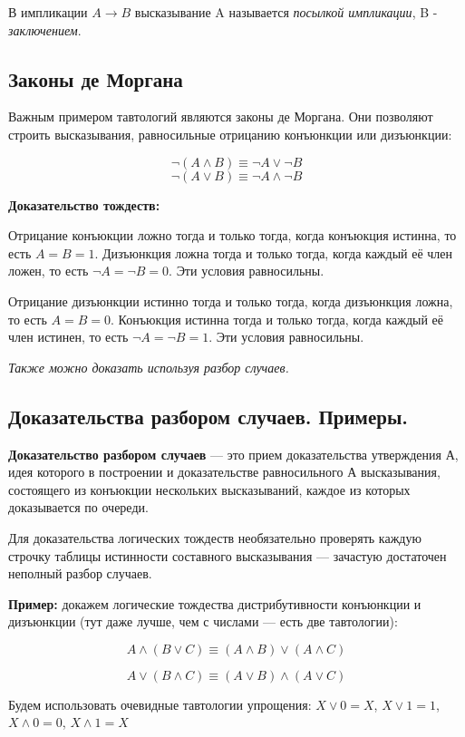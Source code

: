 \documentclass[a4paper, 10pt]{article}
\begin{document}
В импликации $A \to B$ высказывание A называется \textit{посылкой импликации}, B - \textit{заключением}.


\subsection{Законы де Моргана}

Важным примером тавтологий являются законы де Моргана. Они позволяют строить высказывания, равносильные отрицанию конъюнкции или дизъюнкции:

$$\neg(A \wedge B) \equiv \neg A \vee \neg B$$
$$\neg(A \vee B) \equiv \neg A \wedge \neg B$$

\textbf{Доказательство тождеств:}

Отрицание конъюкции ложно тогда и только тогда, когда конъюкция истинна, то есть $A = B = 1$. Дизъюнкция ложна тогда и только тогда, когда каждый её член ложен, то есть $\neg A = \neg B = 0$. Эти условия равносильны.

Отрицание дизъюнкции истинно тогда и только тогда, когда дизъюнкция ложна, то есть $A = B = 0$. Конъюкция  истинна тогда и только тогда, когда каждый её член истинен, то есть $\neg A = \neg B = 1$. Эти условия равносильны.

\textit{Также можно доказать используя разбор случаев.}

\subsection{Доказательства разбором случаев. Примеры.}

\textbf{Доказательство разбором случаев} --- это прием доказательства утверждения А, идея которого в построении и доказательстве равносильного А высказывания, состоящего из конъюкции нескольких высказываний, каждое из которых доказывается по очереди.

Для доказательства логических тождеств необязательно проверять каждую строчку таблицы истинности составного высказывания --- зачастую достаточен неполный разбор случаев.

\textbf{Пример:} докажем логические тождества дистрибутивности конъюнкции и дизъюнкции (тут даже лучше, чем с числами — есть две тавтологии):

$$A \wedge (B \vee C) \equiv (A \wedge B) \vee (A \wedge C)$$

$$A \vee (B \wedge C) \equiv (A \vee B) \wedge (A \vee C)$$

Будем использовать очевидные тавтологии упрощения: $X \vee 0 = X$, $X \vee 1 = 1$, $X \wedge 0 = 0$, $X \wedge 1 = X$
\end{document}
